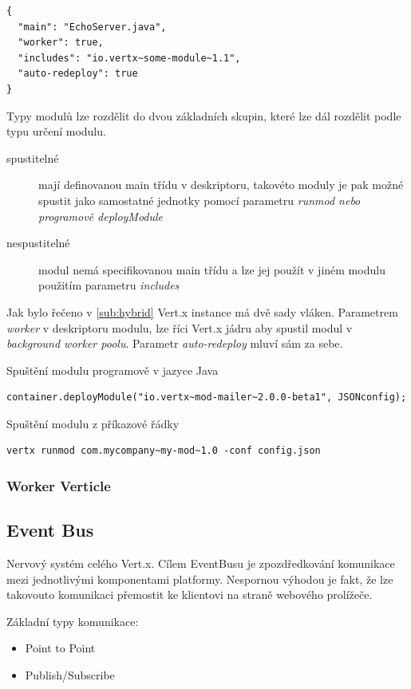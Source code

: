 \begin{lstlisting}
{
  "main": "EchoServer.java",
  "worker": true,
  "includes": "io.vertx~some-module~1.1",
  "auto-redeploy": true
}
\end{lstlisting}

Typy modulů lze rozdělit do dvou základních skupin, které lze dál rozdělit podle typu určení modulu. 

\begin{description}
\item[spustitelné]{mají definovanou main třídu v deskriptoru, takovéto moduly je pak možné spustit jako samostatné jednotky pomocí parametru \emph{runmod nebo programově deployModule} }
\item[nespustitelné]{modul nemá specifikovanou main třídu a lze jej použít v jiném modulu použitím parametru \emph{includes}}
\end{description}

Jak bylo řečeno v \ref{sub:hybrid} Vert.x instance má dvě sady vláken. Parametrem \emph{worker} v deskriptoru modulu, lze říci Vert.x jádru aby spustil modul v \emph{background worker poolu}. Parametr \emph{auto-redeploy} mluví sám za sebe.

Spuštění modulu programově v jazyce Java
\begin{lstlisting}
container.deployModule("io.vertx~mod-mailer~2.0.0-beta1", JSONconfig);
\end{lstlisting}

Spuštění modulu z příkazové řádky
\begin{lstlisting}
vertx runmod com.mycompany~my-mod~1.0 -conf config.json
\end{lstlisting}

\subsubsection{Worker Verticle}

\subsection{Event Bus}

Nervový systém celého Vert.x. Cílem EventBusu je zpozdředkování komunikace mezi jednotlivými komponentami platformy. 
Nespornou výhodou je fakt, že lze takovouto komunikaci přemostit ke klientovi na straně webového prolížeče.

Základní typy komunikace:
\begin{itemize}
\item{Point to Point}
\item{Publish/Subscribe}
\end{itemize}


